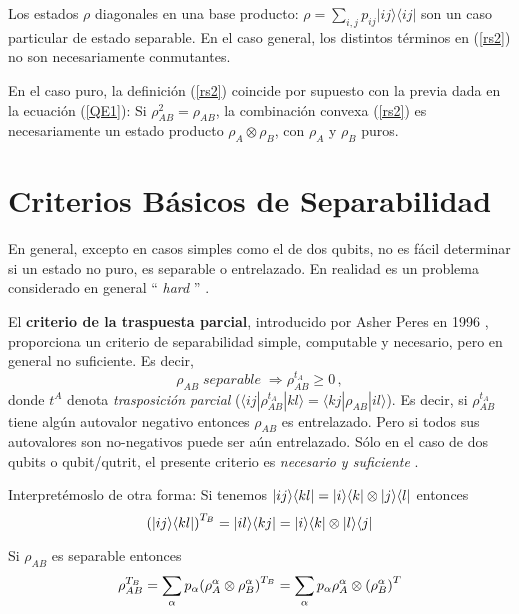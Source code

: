 Los estados $\rho$ diagonales en una base producto: $\rho=\sum_{i,j}p_{ij}|ij\rangle\langle ij|
\label{rhoclas}$ 
son un caso particular de estado separable.
En el caso general, los distintos t\'erminos en (\ref{rs2}) no son necesariamente conmutantes.

En el caso puro, la definición (\ref{rs2}) coincide por supuesto con la previa
dada en la ecuación (\ref{QE1}): Si $\rho_{AB}^2=\rho_{AB}$, la combinación convexa
(\ref{rs2}) es necesariamente un estado producto $\rho_A\otimes\rho_B$,
con $\rho_A$ y $\rho_B$ puros.

\section{Criterios Básicos de Separabilidad} 
En general, excepto en casos simples como el de dos qubits, no es f\'acil determinar si un estado no puro,
es separable o entrelazado. En realidad es un problema considerado en general `` {\it hard} '' \cite{Gr.01}.

El {\bf criterio de la traspuesta parcial}, introducido por Asher Peres en 1996
\cite{P.96}, proporciona un criterio de separabilidad simple, computable y necesario, pero en general no suficiente. Es decir,
\begin{equation}
\rho_{AB}\;{separable}\;\Rightarrow
\rho_{AB}^{t_A}\geq 0\,,
\end{equation}
donde $t^A$ denota {\it trasposición parcial} \cite{NC.00}
($\langle ij|\rho_{AB}^{t_A}|kl\rangle=\langle kj|\rho_{AB}|il\rangle$).
Es decir, si $\rho_{AB}^{t_A}$ tiene algún autovalor negativo entonces $\rho_{AB}$ es entrelazado.
Pero si todos sus autovalores son no-negativos puede ser aún entrelazado. S\'olo
en el caso de dos qubits o qubit/qutrit, el presente criterio es {\it
necesario y suficiente} \cite{P.96,Ho.96}.


Interpretémoslo de otra forma: 
Si tenemos $|ij \rangle\langle kl|=|i \rangle\langle k|\otimes|j \rangle\langle l|$ entonces
\[
\PARENTESIS{\PROYECT{ij}{kl}}^{T_{B}}=\PROYECT{il}{kj}=\PROYECT ik\otimes\PROYECT lj
\]

Si $\rho_{AB}$ es separable entonces 
\[
\rho_{AB}^{T_{B}}=\sum_{\alpha}p_{\alpha}\PARENTESIS{\rho_{A}^{\alpha}\otimes\rho_{B}^{\alpha}}^{T_{B}}=\sum_{\alpha}p_{\alpha}\rho_{A}^{\alpha}\otimes\PARENTESIS{\rho_{B}^{\alpha}}^{T}
\]

